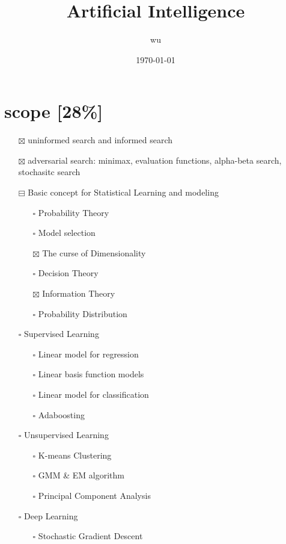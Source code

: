 \documentclass[11pt]{article}
\author{wu}
\date{\today}
\title{Artificial Intelligence}
\begin{document}
\maketitle
\tableofcontents

\section{scope [28\%]}
\label{sec:org024efc6}
\begin{itemize}
\item[{$\boxtimes$}] uninformed search and informed search
\item[{$\boxtimes$}] adversarial search: minimax, evaluation functions, alpha-beta search,
stochasitc search
\item[{$\boxminus$}] Basic concept for Statistical Learning and modeling
\begin{itemize}
\item[{$\square$}] Probability Theory
\item[{$\square$}] Model selection
\item[{$\boxtimes$}] The curse of Dimensionality
\item[{$\square$}] Decision Theory
\item[{$\boxtimes$}] Information Theory
\item[{$\square$}] Probability Distribution
\end{itemize}
\item[{$\square$}] Supervised Learning
\begin{itemize}
\item[{$\square$}] Linear model for regression
\item[{$\square$}] Linear basis function models
\item[{$\square$}] Linear model for classification
\item[{$\square$}] Adaboosting
\end{itemize}
\item[{$\square$}] Unsupervised Learning
\begin{itemize}
\item[{$\square$}] K-means Clustering
\item[{$\square$}] GMM \& EM algorithm
\item[{$\square$}] Principal Component Analysis
\end{itemize}
\item[{$\square$}] Deep Learning
\begin{itemize}
\item[{$\square$}] Stochastic Gradient Descent

\end{itemize}
\end{itemize}
\end{document}
